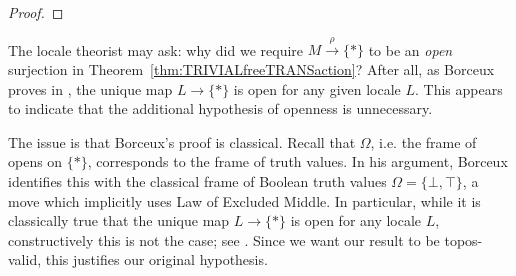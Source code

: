 \documentclass[a4paper, 11pt,reqno]{amsart}
\newcommand{\M}{\mathcal{M}}
\newcommand{\m}{\mathfrak{m}}
\begin{document}
\begin{proof}

	
\end{proof}

\begin{discussion} The locale theorist may ask: why did we require $M\xrightarrow{\rho} \{*\}$ to be an \emph{open} surjection in Theorem~\ref{thm:TRIVIALfreeTRANSaction}? After all, as Borceux proves in \cite[Example 1.6.5c]{Borceux}, the unique map $L\rightarrow\{*\}$ is open for any given locale $L$. This appears to indicate that the additional hypothesis of openness is unnecessary.
	
The issue is that Borceux's proof is classical. Recall that $\Omega$, i.e. the frame of opens on $\{*\}$, corresponds to the frame of truth values. In his argument, Borceux identifies this with the classical frame of Boolean truth values $\Omega=\{\bot,\top\}$, a move which implicitly uses Law of Excluded Middle. In particular, while it is classically true that the unique map $L\to \{\ast\}$ is open for any locale $L$, constructively this is not the case; see \cite[\S 6.2]{ViLocCompII}. Since we want our result to be topos-valid, this justifies our original hypothesis.

\end{discussion}
\end{document}
